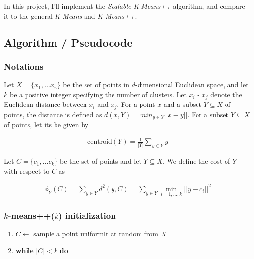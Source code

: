 \documentclass{article}
\begin{document}
In this project, I'll implement the \emph{Scalable K Means++} algorithm,
and compare it to the general \emph{K Means} and \emph{K Means++}.

    \subsection{Algorithm / Pseudocode}\label{algorithm-pseudocode}

    \subsubsection{Notations}\label{notations}

Let \(X =\{x_1,...x_n\}\) be the set of points in \(d\)-dimensional
Euclidean space, and let \(k\) be a positive integer specifying the
number of clusters. Let \textbar{}\textbar{}\(x_i\) - \(x_j\)
\textbar{}\textbar{} denote the Euclidean distance between \(x_i\) and
\(x_j\). For a point \(x\) and a subset \(Y \subseteq X\) of points, the
distance is defined as \(d(x,Y) = min_{y \in Y} ||x - y||\). For a
subset \(Y \subseteq X\) of points, let its  be given by

\begin{equation*}
\begin{split}
    \text{centroid}(Y) = \frac{1}{|Y|}\sum_{y \in Y} y
\end{split}
\end{equation*}

Let \(C =\{c_1,...c_k\}\) be the set of points and let
\(Y \subseteq X\). We define the cost of \(Y\) with respect to \(C\) as

\begin{equation*}
\begin{split}
    \phi_Y(C) = \sum_{y \in Y} d^2(y,C) = \sum_{y \in Y} \min_{i=1,...,k}||y-c_i||^2
\end{split}
\end{equation*}

\subsubsection{\texorpdfstring{\(k\)-means++(\(k\))
initialization}{k-means++(k) initialization}}\label{k-meansk-initialization}

\begin{enumerate}
\def\labelenumi{\arabic{enumi}.}
\itemsep1pt\parskip0pt
\item
  \(C \leftarrow\) sample a point uniformlt at random from \(X\)
\item
  \textbf{while} \(|C|<k\) \textbf{do}
\end{enumerate}
\end{document}
